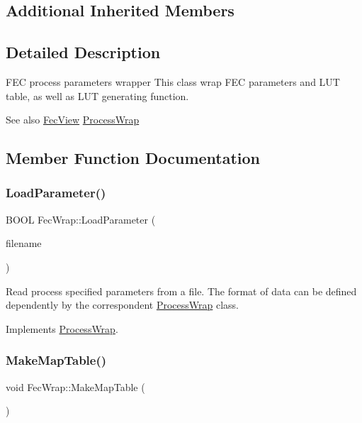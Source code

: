 \subsection*{Additional Inherited Members}


\subsection{Detailed Description}
F\+EC process parameters wrapper This class wrap F\+EC parameters and L\+UT table, as well as L\+UT generating function. 

\begin{DoxySeeAlso}{See also}
\mbox{\hyperlink{class_fec_view}{Fec\+View}} \mbox{\hyperlink{class_process_wrap}{Process\+Wrap}} 
\end{DoxySeeAlso}


\subsection{Member Function Documentation}
\mbox{\label{class_fec_wrap_a3f55d86b6b99108b360b66d1d180a66c}} 
\subsubsection{\texorpdfstring{Load\+Parameter()}{LoadParameter()}}
{\footnotesize\ttfamily B\+O\+OL Fec\+Wrap\+::\+Load\+Parameter (\begin{DoxyParamCaption}\item[{L\+P\+C\+T\+S\+TR}]{filename }\end{DoxyParamCaption})\hspace{0.3cm}{\ttfamily [virtual]}}

Read process specified parameters from a file. The format of data can be defined dependently by the correspondent \mbox{\hyperlink{class_process_wrap}{Process\+Wrap}} class. 

Implements \mbox{\hyperlink{class_process_wrap_a1cb75a423ff8f5ef736fc00a34792493}{Process\+Wrap}}.

\mbox{\label{class_fec_wrap_ac1c213fd03716ce0bb6430e2d2bf7962}} 
\subsubsection{\texorpdfstring{Make\+Map\+Table()}{MakeMapTable()}}
{\footnotesize\ttfamily void Fec\+Wrap\+::\+Make\+Map\+Table (\begin{DoxyParamCaption}{ }\end{DoxyParamCaption})\hspace{0.3cm}{\ttfamily [virtual]}}

